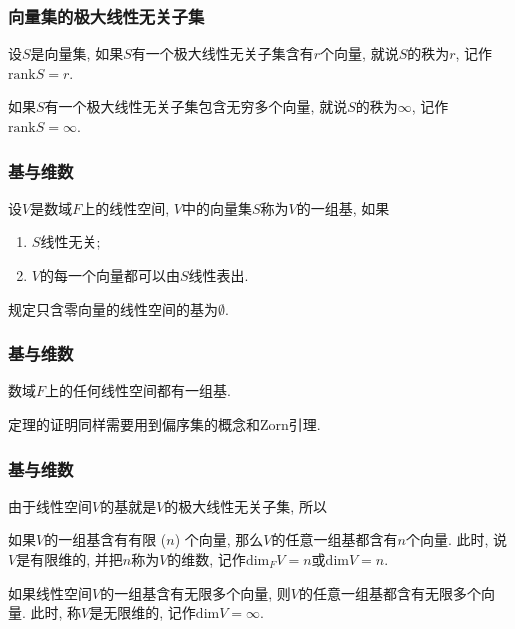 \documentclass[CJK]{beamer}
\begin{document}
\begin{frame}
	\frametitle{向量集的极大线性无关子集} \pause
	\begin{definition}
		设$S$是向量集, 如果$S$有一个极大线性无关子集含有$r$个向量, 就说$S$的秩为$r$, 记作$\mathrm{rank}S=r$.\pause
		\vspace{0.5cm}
		
		如果$S$有一个极大线性无关子集包含无穷多个向量, 就说$S$的秩为$\infty$, 记作$\mathrm{rank}S=\infty$.
	\end{definition}
\end{frame}

\begin{frame}
	\frametitle{基与维数} \pause
	\begin{definition}
		设$V$是数域$F$上的线性空间, $V$中的向量集$S$称为$V$的一组基, 如果\begin{enumerate}[1]
			\item $S$线性无关;
			\item $V$的每一个向量都可以由$S$线性表出.
		\end{enumerate} \pause
	\vspace{0.5cm}
	
	规定只含零向量的线性空间的基为$\emptyset$.
	\end{definition}

\end{frame}

\begin{frame}
	\frametitle{基与维数} \pause
	\begin{theorem}
		数域$F$上的任何线性空间都有一组基.
	\end{theorem} \pause
\vspace{0.5cm}

定理的证明同样需要用到偏序集的概念和Zorn引理.
\end{frame}

\begin{frame}
	\frametitle{基与维数} \pause
	由于线性空间$V$的基就是$V$的极大线性无关子集, 所以\pause
	
	\begin{definition}
		如果$V$的一组基含有有限 ($n$) 个向量, 那么$V$的任意一组基都含有$n$个向量. 此时, 说$V$是有限维的, 并把$n$称为$V$的维数, 记作$\mathrm{dim}_{F}V=n$或$\mathrm{dim}V=n$.
    \end{definition}	\pause

\begin{definition}
	如果线性空间$V$的一组基含有无限多个向量, 则$V$的任意一组基都含有无限多个向量. 此时, 称$V$是无限维的, 记作$\mathrm{dim}V=\infty$.
\end{definition}
\end{frame}
\end{document}
